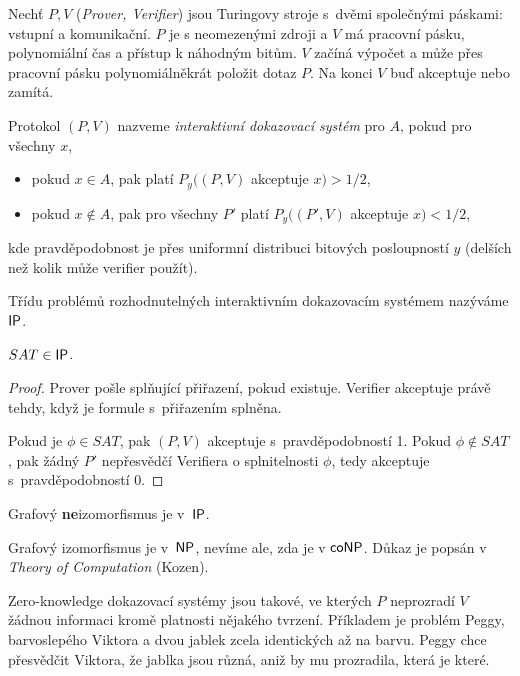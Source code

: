 \begin{definition}
    Nechť $P, V$ ({\em Prover, Verifier}) jsou Turingovy stroje s~dvěmi
    společnými páskami: vstupní a komunikační. $P$ je s neomezenými
    zdroji a $V$ má pracovní pásku, polynomiální čas a přístup k
    náhodným bitům. $V$ začíná výpočet a může přes pracovní pásku
    polynomiálněkrát položit dotaz $P$. Na konci $V$ buď akceptuje
    nebo zamítá.

    Protokol $(P,V)$ nazveme {\em interaktivní dokazovací systém} pro
    $A$, pokud pro všechny $x$,
    \begin{itemize}
        \item pokud $x \in A$, pak platí $P_y((P,V)$ akceptuje $x) > 1/2$,
        \item pokud $x \not \in A$, pak pro všechny $P'$ platí $P_y((P',V)$
            akceptuje $x) < 1/2$,
    \end{itemize}
    kde pravděpodobnost je přes uniformní distribuci bitových
    posloupností $y$ (delších než kolik může verifier použít).

    Třídu problémů rozhodnutelných interaktivním dokazovacím systémem nazýváme
    ${\mathsf{IP}}$.
\end{definition}

\pagebreak

\begin{theorem}
    $SAT \in {\ensuremath{\mathsf{IP}}}$.
\end{theorem}

\begin{proof}
    Prover pošle splňující přiřazení, pokud existuje. Verifier
    akceptuje právě tehdy, když je formule s~přiřazením splněna.

    Pokud je $\phi \in SAT$, pak $(P,V)$ akceptuje s~pravděpodobností 1.
    Pokud $\phi \not \in SAT$, pak žádný $P'$ nepřesvědčí Verifiera o
    splnitelnosti $\phi$, tedy akceptuje s~pravděpodobností 0.
\end{proof}

\begin{theorem}
    Grafový {\bf ne}izomorfismus je v~${\mathsf{IP}}$.
\end{theorem}

Grafový izomorfismus je v~${\mathsf{NP}}$, nevíme ale, zda je v ${\mathsf{coNP}}$.
Důkaz je popsán v {\em Theory of Computation} (Kozen).


Zero-knowledge dokazovací systémy jsou takové, ve kterých $P$ neprozradí
$V$ žádnou informaci kromě platnosti nějakého tvrzení. Příkladem je
problém Peggy, barvoslepého Viktora a dvou jablek zcela identických až
na barvu. Peggy chce přesvědčit Viktora, že jablka jsou různá, aniž by
mu prozradila, která je které.

